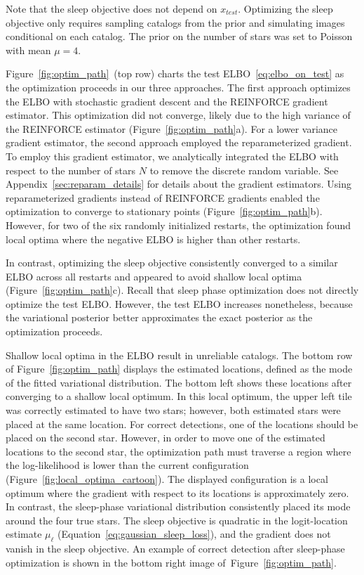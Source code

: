 Note that the sleep objective does not depend on $x_{test}$. 
Optimizing the sleep objective only requires sampling catalogs from the prior
and simulating images conditional on each catalog. 
The prior on the number of stars was set to Poisson with mean $\mu = 4$. 

Figure~\ref{fig:optim_path}~(top row) charts the test ELBO~\eqref{eq:elbo_on_test} as the optimization proceeds in our three approaches.
The first approach optimizes the ELBO with stochastic gradient descent and the REINFORCE gradient estimator.
This optimization did not converge, likely due to the high variance of the REINFORCE estimator (Figure~\ref{fig:optim_path}a). 
For a lower variance gradient estimator, the second approach employed the reparameterized gradient. To employ this gradient estimator, we analytically integrated the ELBO with respect to the number of stars $N$ to remove the discrete random variable. 
See Appendix~\ref{sec:reparam_details} for details about the gradient estimators. 
Using reparameterized gradients instead of REINFORCE gradients enabled the optimization to converge to stationary points (Figure~\ref{fig:optim_path}b). 
However, for two of the six randomly initialized restarts, 
the optimization found local optima where the negative ELBO is higher than other restarts. 

In contrast, optimizing the sleep objective consistently converged to a similar ELBO across all restarts and appeared to avoid shallow local optima (Figure~\ref{fig:optim_path}c).
Recall that sleep phase optimization does not directly optimize the test ELBO. However, the test ELBO increases nonetheless, because the variational posterior better approximates the exact posterior as the optimization proceeds. 

Shallow local optima in the ELBO result in unreliable catalogs. 
The bottom row of Figure~\ref{fig:optim_path} displays the estimated locations, defined as the mode of the fitted variational distribution. 
The bottom left shows these locations after converging to a shallow local optimum. 
In this local optimum, the upper left tile was correctly estimated to have two stars; however, both estimated stars were placed at the same location.
For correct detections, one of the locations should be placed on the second star.
However, in order to move one of the estimated locations to the second star, the optimization path must traverse a region where the log-likelihood is lower than the current configuration (Figure~\ref{fig:local_optima_cartoon}). 
The displayed configuration is a local optimum where the gradient with respect to its locations is approximately zero.
In contrast, the sleep-phase variational distribution consistently placed its mode around the four true stars. 
The sleep objective is quadratic in the logit-location estimate $\mu_\ell$ (Equation~\ref{eq:gaussian_sleep_loss}), and the gradient does not vanish in the sleep objective. 
An example of correct detection after sleep-phase optimization is shown in the bottom right image of~Figure~\ref{fig:optim_path}.

